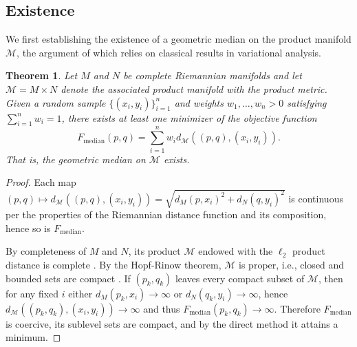 \documentclass[10pt]{article}
\newtheorem{theorem}{Theorem}[section]
\newcommand{\calM}{\mathcal{M}}
\begin{document}
\subsection{Existence}

We first establishing the existence of a geometric median on the product manifold $\calM$, the argument of which relies on classical results in variational analysis.

\begin{theorem}\label{theory:existence}
	Let $M$ and $N$ be complete Riemannian manifolds and let $\calM = M\times N$ denote the associated product manifold with the product metric. Given a random sample $\lbrace (x_i,y_i)\rbrace_{i=1}^n$ and weights $w_1,\ldots,w_n > 0$ satisfying $\sum_{i=1}^n w_i = 1$, 
	there exists at least one minimizer of the objective function \begin{equation*}
		F_{\text{median}}(p,q) = \sum_{i=1}^n w_i d_\calM((p,q), (x_i,y_i)).
	\end{equation*}
	That is, the geometric median on $\calM$ exists.
\end{theorem}
\begin{proof}
	Each map $(p,q)\mapsto d_\calM((p,q), (x_i,y_i))=\sqrt{d_M(p,x_i)^2+d_N(q,y_i)^2}$ is continuous per the properties of the Riemannian distance function \citep{lee_2012_IntroductionSmoothManifolds} and its composition, hence so is $F_{\mathrm{median}}$. 
	
	By completeness of $M$ and $N$, its product $\calM$ endowed with the $\ell_2$ product distance is complete \citep{lee_2018_IntroductionRiemannianManifolds}. By the Hopf-Rinow theorem, $\calM$ is proper, i.e., closed and bounded sets are compact \citep{docarmo_1992_RiemannianGeometry}. If $(p_k,q_k)$ leaves every compact subset of $\calM$, then for any fixed $i$ either $d_M(p_k,x_i)\to\infty$ or $d_N(q_k,y_i)\to\infty$, hence $d_\calM((p_k,q_k),(x_i,y_i))\to\infty$ and thus $F_{\mathrm{median}}(p_k,q_k)\to\infty$. Therefore $F_{\mathrm{median}}$ is coercive, its sublevel sets are compact, and by the direct method it attains a minimum.
\end{proof}
\end{document}
